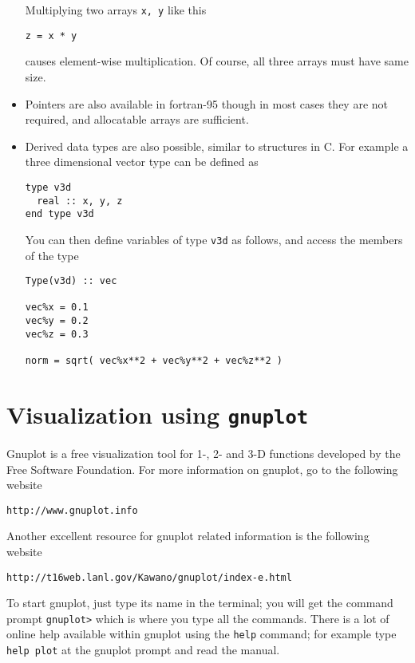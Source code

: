 \documentclass[11pt,oneside]{amsart}
\begin{document}
\begin{itemize}
Multiplying two arrays {\tt x, y} like this
\begin{verbatim}
z = x * y
\end{verbatim}
causes element-wise multiplication. Of course, all three arrays must have same size.

\item Pointers are also available in fortran-95 though in most cases they are not required, and  allocatable arrays are sufficient.

\item Derived data types are also possible, similar to structures in C. For example a three dimensional vector type can be defined as
\begin{verbatim}
type v3d
  real :: x, y, z
end type v3d
\end{verbatim}
You can then define variables of type {\tt v3d} as follows, and access the members of the type
\begin{verbatim}
Type(v3d) :: vec

vec%x = 0.1
vec%y = 0.2
vec%z = 0.3

norm = sqrt( vec%x**2 + vec%y**2 + vec%z**2 )
\end{verbatim}

\end{itemize}

\section{Visualization using {\tt gnuplot}}
\label{gnu}

Gnuplot is a free visualization tool for 1-, 2- and 3-D functions developed by the Free Software Foundation. For more information on gnuplot, go to the following website

\begin{center}
{\tt http://www.gnuplot.info}
\end{center}
Another excellent resource for gnuplot related information is the following website
\begin{center}
{\tt http://t16web.lanl.gov/Kawano/gnuplot/index-e.html}
\end{center}
To start gnuplot, just type its name in the terminal; you will get the command prompt {\tt gnuplot>} which is where you type all the commands. There is a lot of online help available within gnuplot using the {\tt help} command; for example type {\tt help plot} at the gnuplot prompt and read the manual.
\end{document}
